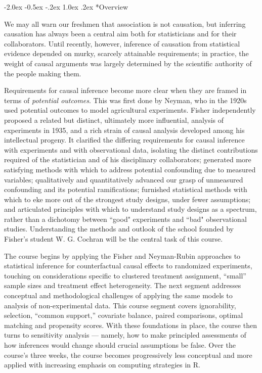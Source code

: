\documentclass[12pt]{article}
\makeatletter
\renewcommand\section{\@startsection{section}{1}{\z@}%
  {-2.0ex \@plus -0.5ex \@minus -.2ex}%
  {1.0ex \@plus .2ex}%
  {\normalfont\Large\bfseries}}
\makeatother
\begin{document}

%

\clearpage


\section*{Overview}

We may all warn our freshmen that association is not causation, but inferring causation has always been a central aim both for statisticians and for their collaborators. Until recently, however, inference of causation from statistical evidence depended on murky, scarcely attainable requirements; in practice, the weight of causal arguments was largely determined by the scientific authority of the people making them.

Requirements for causal inference become more clear when they are framed in terms of \emph{potential outcomes}.  This was first done by Neyman, who in the 1920s used potential outcomes to model agricultural experiments.  Fisher independently proposed a related but distinct, ultimately more influential, analysis of experiments in 1935, and a rich strain of causal analysis developed among his intellectual progeny. It clarified the differing requirements for causal inference with experiments and with observational data, isolating the distinct contributions required of the statistician and of his disciplinary collaborators; generated more satisfying methods with which to address potential confounding due to measured variables; qualitatively and quantitatively advanced our grasp of unmeasured confounding and its potential ramifications; furnished statistical methods with which to eke more out of the strongest study designs, under fewer assumptions; and articulated principles with which to understand study designs as a spectrum, rather than a dichotomy between ``good" experiments and ``bad" observational studies. Understanding the methods and outlook of the school founded by Fisher's student W. G. Cochran will be the central task of this course.

The course begins by applying the Fisher and Neyman-Rubin approaches to statistical inference for counterfactual causal effects to randomized experiments, touching on considerations specific to clustered treatment assignment, ``small'' sample sizes and treatment effect heterogeneity. The next segment addresses conceptual and methodological challenges of applying the same models to analysis of non-experimental data. This course segment covers ignorability, selection, ``common support,'' covariate balance, paired comparisons, optimal matching and propensity scores. With these foundations in place, the course then turns to sensitivity analysis --- namely, how to make principled assessments of how inferences would change should crucial assumptions be false. Over the course's three weeks, the course becomes progressively less conceptual and more applied with increasing emphasis on computing strategies in R.
\end{document}
